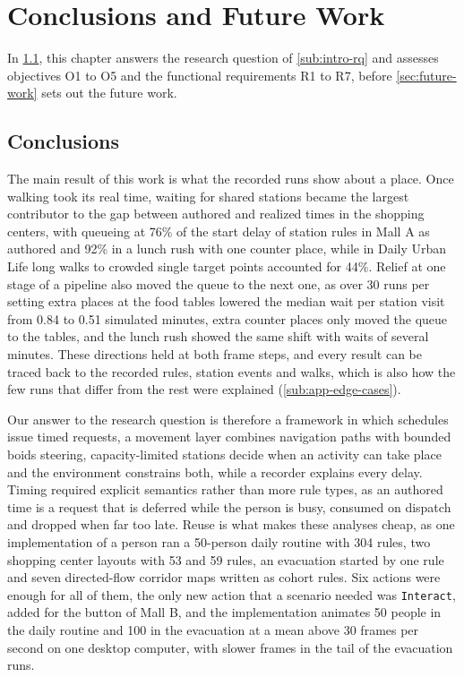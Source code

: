 \chapter{Conclusions and Future Work}\label{chap:conclusions}

In \cref{sec:conclusions}, this chapter answers the research question of \cref{sub:intro-rq} and assesses objectives O1 to O5 and the functional requirements R1 to R7, before \cref{sec:future-work} sets out the future work.

\section{Conclusions}\label{sec:conclusions}

The main result of this work is what the recorded runs show about a place. Once walking took its real time, waiting for shared stations became the largest contributor to the gap between authored and realized times in the shopping centers, with queueing at 76\% of the start delay of station rules in Mall A as authored and 92\% in a lunch rush with one counter place, while in Daily Urban Life long walks to crowded single target points accounted for 44\%. Relief at one stage of a pipeline also moved the queue to the next one, as over 30 runs per setting extra places at the food tables lowered the median wait per station visit from 0.84 to 0.51 simulated minutes, extra counter places only moved the queue to the tables, and the lunch rush showed the same shift with waits of several minutes. These directions held at both frame steps, and every result can be traced back to the recorded rules, station events and walks, which is also how the few runs that differ from the rest were explained (\cref{sub:app-edge-cases}).

Our answer to the research question is therefore a framework in which schedules issue timed requests, a movement layer combines navigation paths with bounded boids steering, capacity-limited stations decide when an activity can take place and the environment constrains both, while a recorder explains every delay. Timing required explicit semantics rather than more rule types, as an authored time is a request that is deferred while the person is busy, consumed on dispatch and dropped when far too late. Reuse is what makes these analyses cheap, as one implementation of a person ran a 50-person daily routine with 304 rules, two shopping center layouts with 53 and 59 rules, an evacuation started by one rule and seven directed-flow corridor maps written as cohort rules. Six actions were enough for all of them, the only new action that a scenario needed was \texttt{Interact}, added for the button of Mall B, and the implementation animates 50 people in the daily routine and 100 in the evacuation at a mean above 30 frames per second on one desktop computer, with slower frames in the tail of the evacuation runs.

